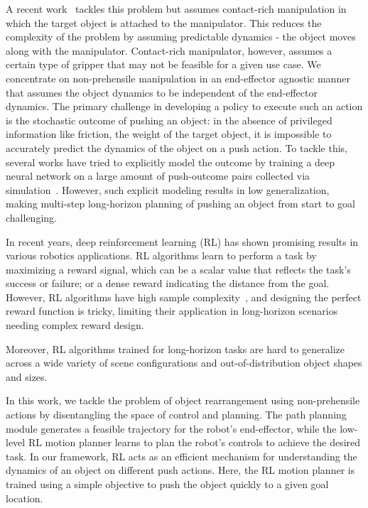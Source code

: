 A recent work~\cite{iros2022} tackles this problem but assumes contact-rich manipulation in which the target object is attached to the manipulator. This reduces the complexity of the problem by assuming predictable dynamics - the object moves along with the manipulator. Contact-rich manipulator, however, assumes a certain type of gripper that may not be feasible for a given use case.  We concentrate on non-prehensile manipulation in an end-effector agnostic manner that assumes the object dynamics to be independent of the end-effector dynamics. The primary challenge in developing a policy to execute such an action is the stochastic outcome of pushing an object: in the absence of privileged information like friction, the weight of the target object, it is impossible to accurately predict the dynamics of the object on a push action. To tackle this, several works have tried to explicitly model the outcome by training a deep neural network on a large amount of push-outcome pairs collected via simulation~\cite{huang2021dipn, huang2021visual, bai2021hierarchical-more}. However, such explicit modeling results in low generalization, making multi-step long-horizon planning of pushing an object from start to goal challenging. 

In recent years, deep reinforcement learning (RL) has shown promising results in various robotics applications. RL algorithms learn to perform a task by maximizing a reward signal, which can be a scalar value that reflects the task's success or failure; or a dense reward indicating the distance from the goal. However, RL algorithms have high sample complexity~\cite{rl_sample_complexitiy}, and designing the perfect reward function is tricky, limiting their application in long-horizon scenarios~\cite{rl_long_horizon} needing complex reward design. 

Moreover, RL algorithms trained for long-horizon tasks are hard to generalize across a wide variety of scene configurations and out-of-distribution object shapes and sizes.

In this work, we tackle the problem of object rearrangement using non-prehensile actions by disentangling the space of control and planning. The path planning module generates a feasible trajectory for the robot's end-effector, while the low-level RL motion planner learns to plan the robot's controls to achieve the desired task. In our framework, RL acts as an efficient mechanism for understanding the dynamics of an object on different push actions. Here, the RL motion planner is trained using a simple objective to push the object quickly to a given goal location. 


